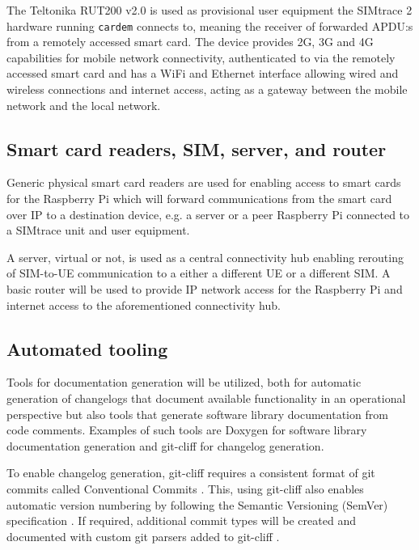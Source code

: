 The Teltonika RUT200 v2.0 is used as provisional user equipment
the SIMtrace 2 hardware running \verb|cardem| connects to, meaning
the receiver of forwarded APDU:s from a remotely accessed smart
card. The device provides 2G, 3G and 4G capabilities for mobile
network connectivity, authenticated to via the remotely accessed
smart card and has a WiFi and Ethernet interface allowing wired
and wireless connections and internet access, acting as a gateway
between the mobile network and the local network.

\subsection{Smart card readers, SIM, server, and router}

Generic physical smart card readers are used for enabling access to
smart cards for the Raspberry Pi which will forward communications
from the smart card over IP to a destination device, e.g. a server
or a peer Raspberry Pi connected to a SIMtrace unit and user
equipment.

A server, virtual or not, is used as a central connectivity hub
enabling rerouting of SIM-to-UE communication to a either a
different UE or a different SIM. A basic router will be used to
provide IP network access for the Raspberry Pi and internet access
to the aforementioned connectivity hub.

\subsection{Automated tooling}

Tools for documentation generation will be utilized, both for
automatic generation of changelogs that document available
functionality in an operational perspective but also tools that
generate software library documentation from code comments.
Examples of such tools are Doxygen \cite{doxygen} for software
library documentation generation and git-cliff \cite{git-cliff} for
changelog generation.

To enable changelog generation, git-cliff requires a consistent
format of git commits \cite{git-cliff} called Conventional Commits
\cite{conventional-commits}. This, using git-cliff also enables
automatic version numbering \cite{git-cliff-bump-version} by
following the Semantic Versioning (SemVer) specification
\cite{semver}. If required, additional commit types will be created
and documented with custom git parsers added to git-cliff \cite{git-cliff-tips-and-tricks}.


